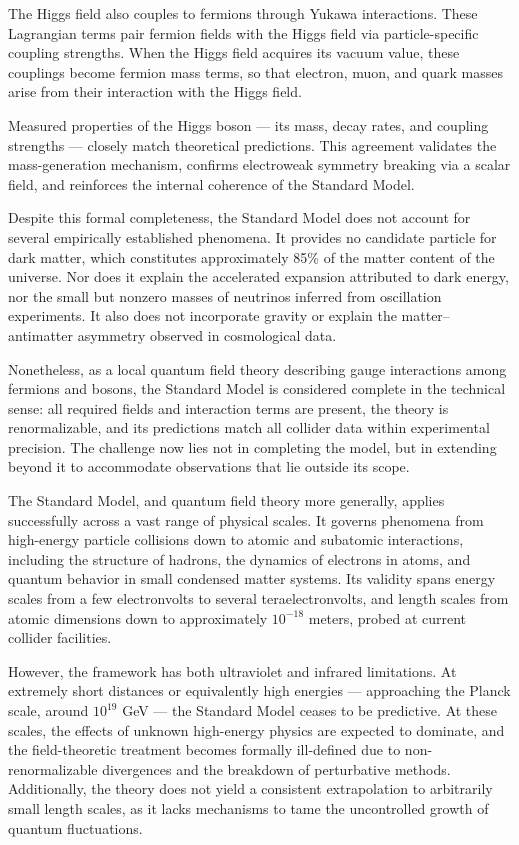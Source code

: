 The Higgs field also couples to fermions through Yukawa interactions. These Lagrangian terms pair fermion fields with the Higgs field via particle-specific coupling strengths. When the Higgs field acquires its vacuum value, these couplings become fermion mass terms, so that electron, muon, and quark masses arise from their interaction with the Higgs field.

Measured properties of the Higgs boson — its mass, decay rates, and coupling strengths — closely match theoretical predictions. This agreement validates the mass-generation mechanism, confirms electroweak symmetry breaking via a scalar field, and reinforces the internal coherence of the Standard Model.

Despite this formal completeness, the Standard Model does not account for several empirically established phenomena. It provides no candidate particle for dark matter, which constitutes approximately 85\% of the matter content of the universe. Nor does it explain the accelerated expansion attributed to dark energy, nor the small but nonzero masses of neutrinos inferred from oscillation experiments. It also does not incorporate gravity or explain the matter–antimatter asymmetry observed in cosmological data.

Nonetheless, as a local quantum field theory describing gauge interactions among fermions and bosons, the Standard Model is considered complete in the technical sense: all required fields and interaction terms are present, the theory is renormalizable, and its predictions match all collider data within experimental precision. The challenge now lies not in completing the model, but in extending beyond it to accommodate observations that lie outside its scope.

The Standard Model, and quantum field theory more generally, applies successfully across a vast range of physical scales. It governs phenomena from high-energy particle collisions down to atomic and subatomic interactions, including the structure of hadrons, the dynamics of electrons in atoms, and quantum behavior in small condensed matter systems. Its validity spans energy scales from a few electronvolts to several teraelectronvolts, and length scales from atomic dimensions down to approximately $10^{-18}$ meters, probed at current collider facilities.

However, the framework has both ultraviolet and infrared limitations. At extremely short distances or equivalently high energies — approaching the Planck scale, around $10^{19}$ GeV — the Standard Model ceases to be predictive. At these scales, the effects of unknown high-energy physics are expected to dominate, and the field-theoretic treatment becomes formally ill-defined due to non-renormalizable divergences and the breakdown of perturbative methods. Additionally, the theory does not yield a consistent extrapolation to arbitrarily small length scales, as it lacks mechanisms to tame the uncontrolled growth of quantum fluctuations.

